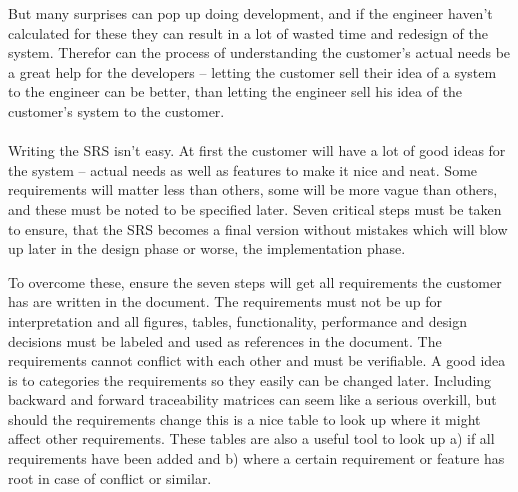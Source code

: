 \documentclass[Main]{subfiles}
\begin{document}
But many surprises can pop up doing development, and if the engineer haven't calculated for these they can result in a lot of wasted time and redesign of the system.
Therefor can the process of understanding the customer's actual needs be a great help for the developers -- letting the customer sell their idea of a system to the engineer can be better, than letting the engineer sell his idea of the customer's system to the customer.
\\
\\
Writing the SRS isn't easy.
At first the customer will have a lot of good ideas for the system -- actual needs as well as features to make it nice and neat.
Some requirements will matter less than others, some will be more vague than others, and these must be noted to be specified later.
Seven critical steps must be taken to ensure, that the SRS becomes a final version without mistakes which will blow up later in the design phase or worse, the implementation phase.

To overcome these, ensure the seven steps will get all requirements the customer has are written in the document.
The requirements must not be up for interpretation and all figures, tables, functionality, performance and design decisions must be labeled and used as references in the document.
The requirements cannot conflict with each other and must be verifiable. 
A good idea is to categories the requirements so they easily can be changed later.
Including backward and forward traceability matrices can seem like a serious overkill, but should the requirements change this is a nice table to look up where it might affect other requirements.
These tables are also a useful tool to look up a) if all requirements have been added and b) where a certain requirement or feature has root in case of conflict or similar.
\end{document}
